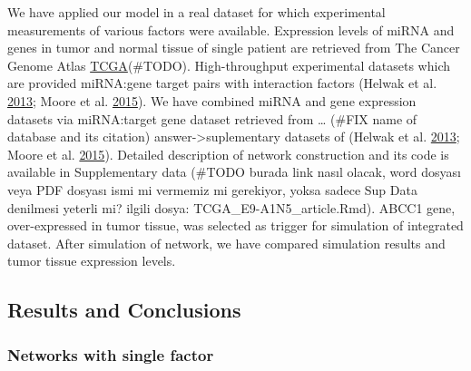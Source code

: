 \documentclass[a4,center,fleqn]{NAR}
\begin{document}
We have applied our model in a real dataset for which experimental
measurements of various factors were available. Expression levels of
miRNA and genes in tumor and normal tissue of single patient are
retrieved from The Cancer Genome Atlas
\href{https://www.cancer.gov/about-nci/organization/ccg/research/structural-genomics/tcga}{TCGA}(\#TODO).
High-throughput experimental datasets which are provided miRNA:gene
target pairs with interaction factors (Helwak et al.
\protect\hyperlink{ref-helwak_mapping_2013}{2013}; Moore et al.
\protect\hyperlink{ref-moore_mirnatarget_2015}{2015}). We have combined
miRNA and gene expression datasets via miRNA:target gene dataset
retrieved from \ldots{} (\#FIX name of database and its citation)
answer-\textgreater{}suplementary datasets of (Helwak et al.
\protect\hyperlink{ref-helwak_mapping_2013}{2013}; Moore et al.
\protect\hyperlink{ref-moore_mirnatarget_2015}{2015}). Detailed
description of network construction and its code is available in
Supplementary data (\#TODO burada link nasıl olacak, word dosyası veya
PDF dosyası ismi mi vermemiz mi gerekiyor, yoksa sadece Sup Data
denilmesi yeterli mi? ilgili dosya: TCGA\_E9-A1N5\_article.Rmd). ABCC1
gene, over-expressed in tumor tissue, was selected as trigger for
simulation of integrated dataset. After simulation of network, we have
compared simulation results and tumor tissue expression levels.

\hypertarget{results-and-conclusions}{%
\subsection{Results and Conclusions}\label{results-and-conclusions}}

\hypertarget{networks-with-single-factor}{%
\subsubsection{Networks with single
factor}\label{networks-with-single-factor}}
\end{document}
